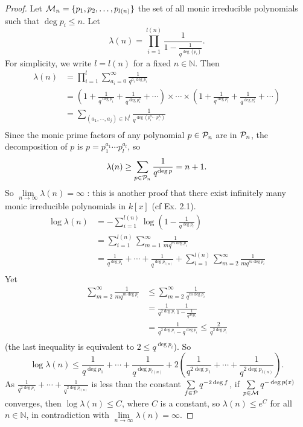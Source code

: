 \documentclass[11pt,a4paper]{article}
\newcommand{\N}{\mathbb{N}}
\begin{document}
{\begin{proof}
Let ${\cal M}_n = \{p_1,p_2,\ldots,p_{l(n)}\}$ the set of all monic irreducible polynomials such that $\deg p_i \leq n$. Let
$$\lambda(n) = \prod_{i = 1}^{l(n)} \frac{1}{1-\frac{1}{q^{\deg(p_i)}}}.$$
For simplicity, we write $l = l(n)$ for a fixed $n \in \N$. Then
\begin{align*}
\lambda(n) &= \prod_{i=1}^l \sum_{a_i=0}^{\infty} \frac{1}{q^{a_i \deg p_i}}\\
&= \left ( 1+\frac{1}{q^{\deg p_1}}+\frac{1}{q^{\deg p_1^2}}+\cdots\right) \times \cdots \times\left ( 1+\frac{1}{q^{\deg p_l}}+\frac{1}{q^{\deg p_l^2}}+\cdots\right)\\
&= \sum_{(a_1,\cdots,a_j) \in \N^l} \frac{1}{q^{\deg(p_1^{a_1}\cdots p_l^{a_l})}}\\
\end{align*}
Since the monic prime factors of  any polynomial $ p \in {\cal P}_n$ are in ${\cal P}_n$, the decomposition of $p$ is $p =p_1^{a_1}\cdots p_l^{a_l}$, so
$$\lambda(n) \geq \sum_{p \in {\cal P}_n} \frac{1}{q^{\deg p}} = n+1.$$
So $\lim\limits_{n\to \infty} \lambda(n) = \infty$ : this is another proof that there exist infinitely many monic irreducible polynomials in $k[x]$ (cf Ex. 2.1).
\begin{align*}
\log \lambda(n) &= - \sum_{i=1}^{l(n)} \log \left( 1 - \frac{1}{q^{\deg p_i}} \right)\\
&=\sum_{i=1}^{l(n)} \sum_{m=1}^{\infty} \frac{1}{m q^{m \deg p_i}}\\
&=\frac{1}{q^{\deg p_1}} + \cdots + \frac{1}{q^{\deg p_{l(n)}}} + \sum_{i=1}^{l(n)} \sum_{m=2}^{\infty} \frac{1}{m q^{m \deg p_i}}\\
\end{align*}
Yet
\begin{align*}
\sum_{m=2}^{\infty} \frac{1}{m q^{m \deg p_i}} &\leq \sum_{m=2}^{\infty} \frac{1}{q^{m \deg p_i}}\\
&= \frac{1}{q^{2\deg p_i}} \frac{1}{1 - \frac{1}{q^{deg p_i}}}\\
&= \frac{1}{q^{2\deg p_i} - q^{\deg p_i}}\leq \frac{2}{q^{2\deg p_i}}\\
\end{align*}
(the last inequality is equivalent to $2\leq q^{\deg p_i}$). So
$$\log \lambda(n) \leq \frac{1}{q^{\deg p_1}} + \cdots +\frac{1}{q^{\deg p_{l(n)}}}+ 2 \left ( \frac{1}{q^{2 \deg p_1}} + \cdots + \frac{1}{q^{2 \deg p_{l(n)}}} \right ).$$
As $\frac{1}{q^{2 \deg p_1}} + \cdots + \frac{1}{q^{2 \deg p_{l(n)}}}$ is less than the constant $\sum\limits_{ f \in \cal P} q^{-2\deg f}$,
 if $\sum\limits_{p \in {\cal M}} q^{-\deg p(x)}$ converges, then $\log \lambda(n) \leq C$, 
 where $C$ is a constant, so $\lambda(n) \leq e^C$ for all $n \in \N$, in contradiction with $\lim\limits_{n\to \infty} \lambda(n) = \infty$.
 

\end{proof}}
\end{document}
